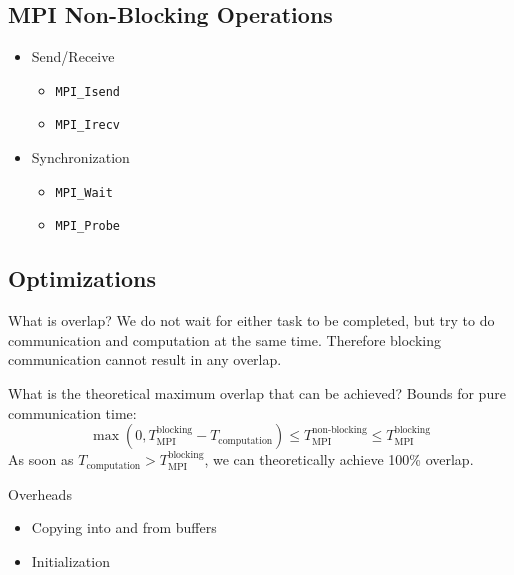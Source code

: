 \documentclass[9pt,pdftex]{beamer}
\begin{document}
\subsection{MPI Non-Blocking Operations}
\begin{frame}{\insertsubsection}
\begin{itemize}
	\item Send/Receive
	\begin{itemize}
	\item \lstinline[basicstyle=\scriptsize\bf]{MPI_Isend}
	\item \lstinline[basicstyle=\scriptsize\bf]{MPI_Irecv}
	\end{itemize}

	\item Synchronization
	\begin{itemize}
	\item \lstinline[basicstyle=\scriptsize\bf]{MPI_Wait}
	\item \lstinline[basicstyle=\scriptsize\bf]{MPI_Probe}
	\end{itemize}
	
\end{itemize}
\end{frame}
\subsection{Optimizations}
\begin{frame}{\insertsubsection}
\begin{block}{What is overlap?}
We do not wait for either task to be completed, but try to do communication and computation at the same time. Therefore blocking communication cannot result in any overlap.
\end{block}
\begin{block}{What is the theoretical maximum overlap that can be achieved?}
Bounds for pure communication time: 
$$\max\left(0, T_\text{MPI}^\text{blocking} - T_\text{computation}\right) \leq T_\text{MPI}^\text{non-blocking} \leq T_\text{MPI}^\text{blocking}$$
As soon as $T_\text{computation}>T_\text{MPI}^\text{blocking}$, we can theoretically achieve 100\% overlap.
\end{block}
\begin{block}{Overheads}
\begin{itemize}
\item Copying into and from buffers
\item Initialization
\end{itemize}
\end{block}
\end{frame}
\end{document}
